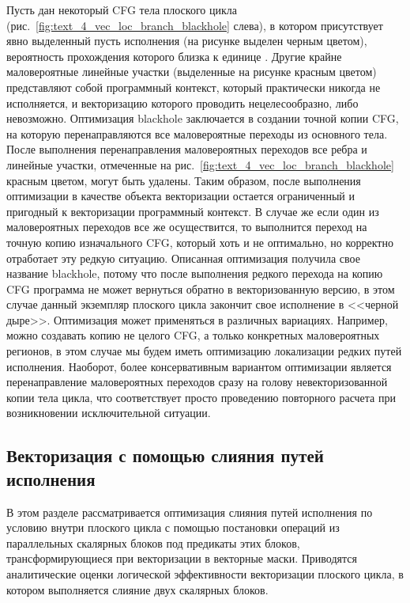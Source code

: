 Пусть дан некоторый CFG тела плоского цикла (рис.~\ref{fig:text_4_vec_loc_branch_blackhole} слева), в котором присутствует явно выделенный пусть исполнения (на рисунке выделен черным цветом), вероятность прохождения которого близка к единице \cite{Shabanov2021VecCFG}.
Другие крайне маловероятные линейные участки (выделенные на рисунке красным цветом) представляют собой программный контекст, который практически никогда не исполняется, и векторизацию которого проводить нецелесообразно, либо невозможно.
Оптимизация blackhole заключается в создании точной копии CFG, на которую перенаправляются все маловероятные переходы из основного тела.
После выполнения перенаправления маловероятных переходов все ребра и линейные участки, отмеченные на рис.~\ref{fig:text_4_vec_loc_branch_blackhole} красным цветом, могут быть удалены.
Таким образом, после выполнения оптимизации в качестве объекта векторизации остается ограниченный и пригодный к векторизации программный контекст.
В случае же если один из маловероятных переходов все же осуществится, то выполнится переход на точную копию изначального CFG, который хоть и не оптимально, но корректно отработает эту редкую ситуацию.
Описанная оптимизация получила свое название blackhole, потому что после выполнения редкого перехода на копию CFG программа не может вернуться обратно в векторизованную версию, в этом случае данный экземпляр плоского цикла закончит свое исполнение в <<черной дыре>>.
Оптимизация может применяться в различных вариациях.
Например, можно создавать копию не целого CFG, а только конкретных маловероятных регионов, в этом случае мы будем иметь оптимизацию локализации редких путей исполнения.
Наоборот, более консервативным вариантом оптимизации является перенаправление маловероятных переходов сразу на голову невекторизованной копии тела цикла, что соответствует просто проведению повторного расчета при возникновении исключительной ситуации.


\subsection{Векторизация с помощью слияния путей исполнения}\label{sec:vec_mrg}

В этом разделе рассматривается оптимизация слияния путей исполнения по условию внутри плоского цикла с помощью постановки операций из параллельных скалярных блоков под предикаты этих блоков, трансформирующиеся при векторизации в векторные маски.
Приводятся аналитические оценки логической эффективности векторизации плоского цикла, в котором выполняется слияние двух скалярных блоков.

